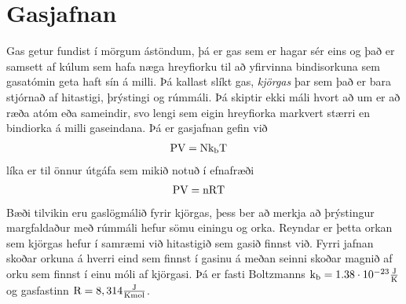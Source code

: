 \chapter{Gasjafnan}\label{section:thermodynamics:idealgas}
Gas getur fundist í mörgum ástöndum, þá er gas sem er hagar sér eins og það er
samsett af kúlum sem hafa næga hreyfiorku til að yfirvinna bindisorkuna
sem gasatómin geta haft sín á milli. Þá kallast slíkt gas, \emph{kjörgas}
þar sem það er bara stjórnað af hitastigi, þrýstingi og rúmmáli. Þá skiptir
ekki máli hvort að um er að ræða atóm eða sameindir, svo lengi sem eigin
hreyfiorka markvert stærri en bindiorka á milli gaseindana. Þá er gasjafnan
gefin við
\begin{align}
	\text{P} \text{V} &= \text{N} \text{k}_\text{b} \text{T}
\end{align}
líka er til önnur útgáfa sem mikið notuð í efnafræði
\begin{align}
	\text{P} \text{V} &= \text{n} \text{R} \text{T}
\end{align}
Bæði tilvikin eru gaslögmálið fyrir kjörgas, þess ber að merkja að
þrýstingur margfaldaður með rúmmáli hefur sömu einingu og orka.
Reyndar er þetta orkan sem kjörgas hefur í samræmi við hitastigið sem gasið
finnst við. Fyrri jafnan skoðar orkuna á hverri eind sem finnst í gasinu á meðan
seinni skoðar magnið af orku sem finnst í einu móli af kjörgasi.
Þá er fasti Boltzmanns $\text{k}_\text{b} = 1.38 \cdot 10^{-23} \frac{\textrm{J}}{\text{K}}$ og gasfastinn
$\text{R} = 8,314 \frac{\textrm{J}}{\text{K} \text{mol}}$. 


